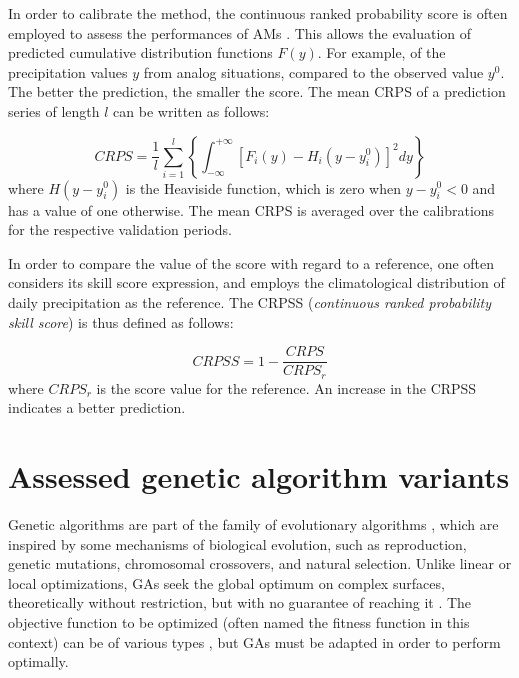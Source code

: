 \documentclass{ametsoc}
\begin{document}
In order to calibrate the method, the continuous ranked probability score \citep[CRPS,][]{Brown1974, Matheson1976, Hersbach2000} is often employed to assess the performances of AMs \citep[see, e.g.,][]{Bontron2004, Bontron2005, BenDaoud2008, Horton2012, Marty2012, Radanovics2013, Chardon2014, Junk2015, BenDaoud2016, Caillouet2016}. This allows the evaluation of predicted cumulative distribution functions $F(y)$. For example, of the precipitation values $y$ from analog situations, compared to the observed value $y^{0}$. The better the prediction, the smaller the score. The mean CRPS of a prediction series of length $l$ can be written as follows:

\begin{equation}
\label{eq:CRPS}
CRPS = \frac{1}{l} \sum_{i=1}^{l} \left\{  \int_{-\infty}^{+\infty} \left[ F_{i}(y)-H_{i}(y-y_{i}^{0})\right]^{2} dy \right\} 
\end{equation}
where $H(y-y_{i}^{0})$ is the Heaviside function, which is zero when $y-y_{i}^{0}<0$ and has a value of one otherwise. The mean CRPS is averaged over the calibrations for the respective validation periods.

In order to compare the value of the score with regard to a reference, one often considers its skill score expression, and employs the climatological distribution of daily precipitation as the reference. The CRPSS (\textit{continuous ranked probability skill score}) is thus defined as follows:

\begin{equation}
\label{eq:CRPSS}
CRPSS = 1-\frac{CRPS}{CRPS_{r}}
\end{equation}
where $CRPS_{r}$ is the score value for the reference. An increase in the CRPSS indicates a better prediction.


\section{Assessed genetic algorithm variants}
\label{sec:gas}

Genetic algorithms \citep[GAs,][]{Holland1992b, Goldberg1989} are part of the family of evolutionary algorithms \citep{Back1993b, Schwefel1993}, which are inspired by some mechanisms of biological evolution, such as reproduction, genetic mutations, chromosomal crossovers, and natural selection. Unlike linear or local optimizations, GAs seek the global optimum on complex surfaces, theoretically without restriction, but with no guarantee of reaching it \citep{Haupt2004}. The objective function to be optimized (often named the fitness function in this context) can be of various types \citep{Joines1996a}, but GAs must be adapted in order to perform optimally.
\end{document}
